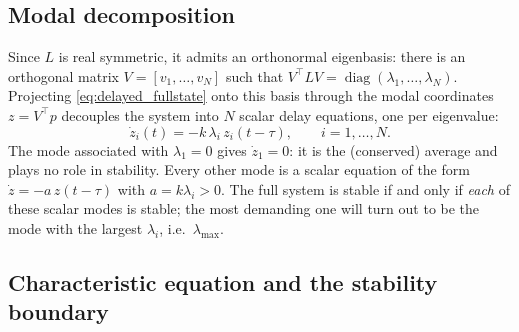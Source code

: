 \documentclass[11pt,a4paper]{article}
\newcommand{\Lap}{L}
\newcommand{\lammax}{\lambda_{\max}}
\begin{document}
\subsection{Modal decomposition}

Since $\Lap$ is real symmetric, it admits an orthonormal eigenbasis: there is an orthogonal
matrix $V=[v_1,\dots,v_N]$ such that $V^\top \Lap V=\operatorname{diag}(\lambda_1,\dots,\lambda_N)$.
Projecting \eqref{eq:delayed_fullstate} onto this basis through the modal coordinates
$z=V^\top p$ decouples the system into $N$ scalar delay equations, one per eigenvalue:
\begin{equation}
\dot z_i(t) = -k\,\lambda_i\,z_i(t-\tau), \qquad i=1,\dots,N.
\label{eq:modal}
\end{equation}
The mode associated with $\lambda_1=0$ gives $\dot z_1=0$: it is the (conserved) average and
plays no role in stability. Every other mode is a scalar equation of the form
$\dot z = -a\,z(t-\tau)$ with $a=k\lambda_i>0$. The full system is stable if and only if
\emph{each} of these scalar modes is stable; the most demanding one will turn out to be the
mode with the largest $\lambda_i$, i.e.\ $\lammax$.

\subsection{Characteristic equation and the stability boundary}
\end{document}
